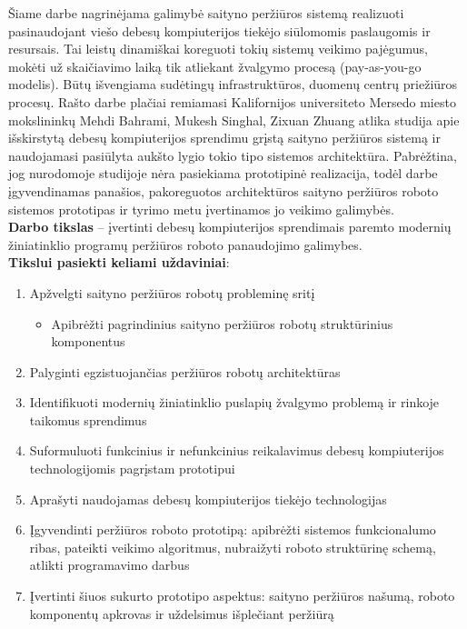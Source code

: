     Šiame darbe nagrinėjama galimybė saityno peržiūros sistemą realizuoti pasinaudojant viešo debesų kompiuterijos tiekėjo siūlomomis paslaugomis ir resursais. Tai leistų dinamiškai koreguoti tokių sistemų veikimo pajėgumus, mokėti už skaičiavimo laiką tik atliekant žvalgymo procesą (pay-as-you-go modelis). Būtų išvengiama sudėtingų infrastruktūros, duomenų centrų priežiūros procesų. Rašto darbe plačiai remiamasi Kalifornijos universiteto Mersedo miesto mokslininkų Mehdi Bahrami, Mukesh Singhal, Zixuan Zhuang atlika studija \cite{MercedCloudBasedWebCrawler} apie išskirstytą debesų kompiuterijos sprendimu grįstą saityno peržiūros sistemą ir naudojamasi pasiūlyta aukšto lygio tokio tipo sistemos architektūra. Pabrėžtina, jog nurodomoje studijoje nėra pasiekiama prototipinė realizacija, todėl darbe įgyvendinamas panašios, pakoreguotos architektūros saityno peržiūros roboto sistemos prototipas ir tyrimo metu įvertinamos jo veikimo galimybės.
\\

\textbf{Darbo tikslas} -- įvertinti debesų kompiuterijos sprendimais paremto modernių žiniatinklio programų peržiūros roboto panaudojimo galimybes. 
\\

\textbf{Tikslui pasiekti keliami uždaviniai}:

\begin{enumerate}
    \item Apžvelgti saityno peržiūros robotų probleminę sritį
    \begin{itemize}
    \item Apibrėžti pagrindinius saityno peržiūros robotų struktūrinius komponentus
    \end{itemize}
    \item Palyginti egzistuojančias peržiūros robotų architektūras
    \item Identifikuoti modernių žiniatinklio puslapių žvalgymo problemą ir rinkoje taikomus sprendimus
    \item Suformuluoti funkcinius ir nefunkcinius reikalavimus debesų kompiuterijos technologijomis pagrįstam prototipui
    \item Aprašyti naudojamas debesų kompiuterijos tiekėjo technologijas
    \item Įgyvendinti peržiūros roboto prototipą: apibrėžti sistemos funkcionalumo ribas, pateikti veikimo algoritmus, nubraižyti roboto struktūrinę schemą, atlikti programavimo darbus
    \item Įvertinti šiuos sukurto prototipo aspektus: saityno peržiūros našumą, roboto komponentų apkrovas ir uždelsimus išplečiant peržiūrą
\end{enumerate}